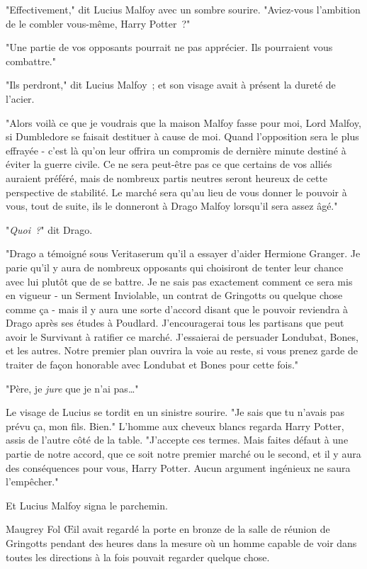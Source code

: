 "Effectivement," dit Lucius Malfoy avec un sombre sourire. "Aviez-vous l'ambition de le combler vous-même, Harry Potter~?"

"Une partie de vos opposants pourrait ne pas apprécier. Ils pourraient vous combattre."

"Ils perdront," dit Lucius Malfoy~; et son visage avait à présent la dureté de l'acier.

"Alors voilà ce que je voudrais que la maison Malfoy fasse pour moi, Lord Malfoy, si Dumbledore se faisait destituer à cause de moi. Quand l'opposition sera le plus effrayée - c'est là qu'on leur offrira un compromis de dernière minute destiné à éviter la guerre civile. Ce ne sera peut-être pas ce que certains de vos alliés auraient préféré, mais de nombreux partis neutres seront heureux de cette perspective de stabilité. Le marché sera qu'au lieu de vous donner le pouvoir à vous, tout de suite, ils le donneront à Drago Malfoy lorsqu'il sera assez âgé."

"\emph{Quoi~?}" dit Drago.

"Drago a témoigné sous Veritaserum qu'il a essayer d'aider Hermione Granger. Je parie qu'il y aura de nombreux opposants qui choisiront de tenter leur chance avec lui plutôt que de se battre. Je ne sais pas exactement comment ce sera mis en vigueur - un Serment Inviolable, un contrat de Gringotts ou quelque chose comme ça - mais il y aura une sorte d'accord disant que le pouvoir reviendra à Drago après ses études à Poudlard. J'encouragerai tous les partisans que peut avoir le Survivant à ratifier ce marché. J'essaierai de persuader Londubat, Bones, et les autres. Notre premier plan ouvrira la voie au reste, si vous prenez garde de traiter de façon honorable avec Londubat et Bones pour cette fois."

"Père, je \emph{jure} que je n'ai pas…"

Le visage de Lucius se tordit en un sinistre sourire. "Je sais que tu n'avais pas prévu ça, mon fils. Bien." L'homme aux cheveux blancs regarda Harry Potter, assis de l'autre côté de la table. "J'accepte ces termes. Mais faites défaut à une partie de notre accord, que ce soit notre premier marché ou le second, et il y aura des conséquences pour vous, Harry Potter. Aucun argument ingénieux ne saura l'empêcher."

Et Lucius Malfoy signa le parchemin.

\later

Maugrey Fol Œil avait regardé la porte en bronze de la salle de réunion de Gringotts pendant des heures dans la mesure où un homme capable de voir dans toutes les directions à la fois pouvait regarder quelque chose.


